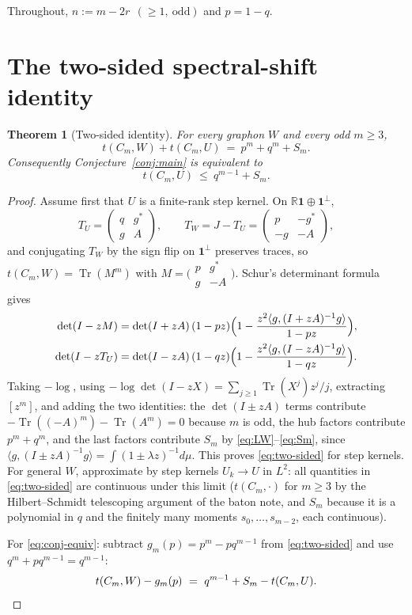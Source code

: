 \documentclass[11pt]{article}
\newtheorem{theorem}{Theorem}[section]
\newcommand{\one}{\mathbf 1}
\newcommand{\ip}[2]{\langle #1,#2\rangle}
\newcommand{\Tr}{\operatorname{Tr}}
\newcommand{\R}{\mathbb R}
\begin{document}
Throughout, $n:=m-2r\ \ (\ge1,\ \text{odd})$ and $p=1-q$.

\section{The two-sided spectral-shift identity}\label{sec:identity}

\begin{theorem}[Two-sided identity]\label{thm:two-sided}
For every graphon $W$ and every odd $m\ge3$,
\begin{equation}\label{eq:two-sided}
        t(C_m,W)+t(C_m,U)\ =\ p^m+q^m+S_m .
\end{equation}
Consequently Conjecture~\ref{conj:main} is equivalent to
\begin{equation}\label{eq:conj-equiv}
        t(C_m,U)\ \le\ q^{m-1}+S_m .
\end{equation}
\end{theorem}

\begin{proof}
Assume first that $U$ is a finite-rank step kernel.  On $\R\one\oplus\one^\perp$,
\[
        T_U=\begin{pmatrix}q&g^*\\ g&A\end{pmatrix},
        \qquad
        T_W=J-T_U=\begin{pmatrix}p&-g^*\\ -g&-A\end{pmatrix},
\]
and conjugating $T_W$ by the sign flip on $\one^\perp$ preserves traces, so $t(C_m,W)=\Tr(M^m)$ with $M=\bigl(\begin{smallmatrix}p&g^*\\ g&-A\end{smallmatrix}\bigr)$.  Schur's determinant formula gives
\begin{align*}
        \det(I-zM)&=\det(I+zA)\,(1-pz)\Bigl(1-\frac{z^2\ip{g}{(I+zA)^{-1}g}}{1-pz}\Bigr),\\
        \det(I-zT_U)&=\det(I-zA)\,(1-qz)\Bigl(1-\frac{z^2\ip{g}{(I-zA)^{-1}g}}{1-qz}\Bigr).
\end{align*}
Taking $-\log$, using $-\log\det(I-zX)=\sum_{j\ge1}\Tr(X^j)z^j/j$, extracting $[z^m]$, and adding the two identities: the $\det(I\pm zA)$ terms contribute $-\Tr((-A)^m)-\Tr(A^m)=0$ because $m$ is odd, the hub factors contribute $p^m+q^m$, and the last factors contribute $S_m$ by \eqref{eq:LW}--\eqref{eq:Sm}, since $\ip{g}{(I\pm zA)^{-1}g}=\int(1\pm\lambda z)^{-1}d\mu$.  This proves \eqref{eq:two-sided} for step kernels.  For general $W$, approximate by step kernels $U_k\to U$ in $L^2$: all quantities in \eqref{eq:two-sided} are continuous under this limit ($t(C_m,\cdot)$ for $m\ge3$ by the Hilbert--Schmidt telescoping argument of the baton note, and $S_m$ because it is a polynomial in $q$ and the finitely many moments $s_0,\dots,s_{m-2}$, each continuous).

For \eqref{eq:conj-equiv}: subtract $g_m(p)=p^m-pq^{m-1}$ from \eqref{eq:two-sided} and use $q^m+pq^{m-1}=q^{m-1}$:
\begin{equation}\label{eq:defect-form}
        t(C_m,W)-g_m(p)\ =\ q^{m-1}+S_m-t(C_m,U). \qedhere
\end{equation}
\end{proof}
\end{document}
